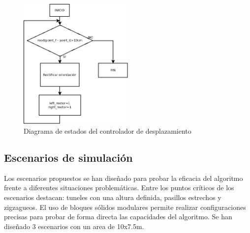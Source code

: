 \begin{figure}[H]
		\centering
        \includegraphics[width=0.5\textwidth]{images/flujoavance.png}
        \caption{Diagrama de estados del controlador de desplazamiento}
        \label{fig:flujoavance}
\end{figure} 

\subsection{Escenarios de simulación}

Los escenarios propuestos se han diseñado para probar la eficacia del algoritmo frente a diferentes situaciones problemáticas. Entre los puntos críticos de los escenarios destacan: tuneles con una altura definida, pasillos estrechos y zigzagueos. El uso de bloques sólidos modulares permite realizar configuraciones precisas para probar de forma directa las capacidades del algoritmo. Se han diseñado 3 escenarios con un area de 10x7.5m.

